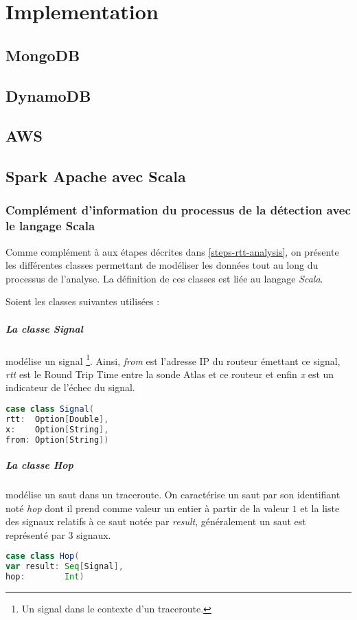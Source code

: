 \chapter{Implementation}

\section{MongoDB}

\section{DynamoDB}

\section{AWS}

\section{Spark Apache avec Scala}

\subsection{Complément d'information du processus de la détection avec le langage Scala}
Comme complément à aux étapes décrites dans \ref{steps-rtt-analysis}, on présente les différentes classes permettant de modéliser les données tout au long du processus de l'analyse. La définition de ces classes est liée au langage \textit{Scala}. 

Soient les classes suivantes utilisées : 

\paragraph{La classe Signal} modélise un signal \footnote{Un signal dans le contexte d'un traceroute.}. Ainsi, \textit{from} est l'adresse IP du routeur émettant ce signal, \textit{rtt} est le Round Trip Time entre la sonde Atlas et ce routeur et enfin \textit{x} est un indicateur de l'échec du signal.
\begin{lstlisting}[language=scala]
case class Signal(
rtt:  Option[Double],
x:    Option[String],
from: Option[String])
\end{lstlisting}

\paragraph{La classe Hop} modélise un saut dans un traceroute. On caractérise un saut par son identifiant noté \textit{hop} dont il prend comme valeur un entier à partir de la valeur $1$ et la liste des signaux relatifs à ce saut notée par \textit{result}, généralement un saut est représenté par $3$ signaux.
\begin{lstlisting}[language=scala]
case class Hop(
var result: Seq[Signal],
hop:        Int)
\end{lstlisting}
